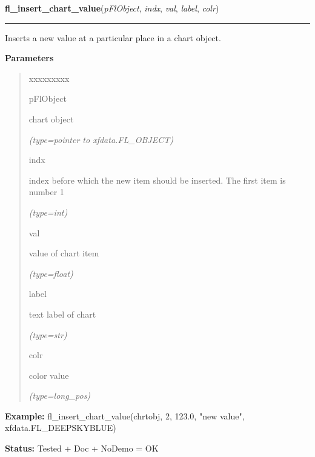     \label{xformslib:flchart:fl_insert_chart_value}

    \vspace{0.5ex}

\hspace{.8\funcindent}\begin{boxedminipage}{\funcwidth}

    \raggedright \textbf{fl\_insert\_chart\_value}(\textit{pFlObject}, \textit{indx}, \textit{val}, \textit{label}, \textit{colr})

    \vspace{-1.5ex}

    \rule{\textwidth}{0.5\fboxrule}
\setlength{\parskip}{2ex}
    Inserts a new value at a particular place in a chart object.

\setlength{\parskip}{1ex}
      \textbf{Parameters}
      \vspace{-1ex}

      \begin{quote}
        \begin{Ventry}{xxxxxxxxx}

          \item[pFlObject]

          chart object

            {\it (type=pointer to xfdata.FL\_OBJECT)}

          \item[indx]

          index before which the new item should be inserted. The first 
          item is number 1

            {\it (type=int)}

          \item[val]

          value of chart item

            {\it (type=float)}

          \item[label]

          text label of chart

            {\it (type=str)}

          \item[colr]

          color value

            {\it (type=long\_pos)}

        \end{Ventry}

      \end{quote}

\textbf{Example:} fl\_insert\_chart\_value(chrtobj, 2, 123.0, "new value", 
xfdata.FL\_DEEPSKYBLUE)



\textbf{Status:} Tested + Doc + NoDemo = OK



    \end{boxedminipage}

